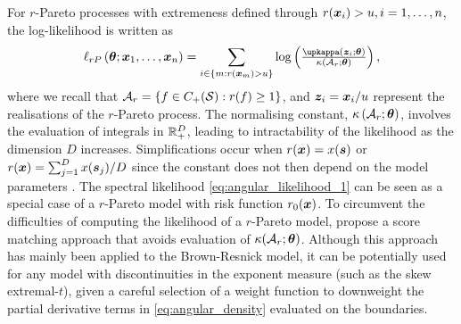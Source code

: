 \documentclass[12pt]{article}
\newcommand{\PZ}{\textcolor{blue}}
\begin{document}

For $r$-Pareto processes with extremeness defined through $r({\boldsymbol{x}}_i)>u, i=1, \ldots,n$, the log-likelihood is written as
%
\begin{equation}\label{eq:angular_likelihood_3}
\ell_{rP}\left( \bm \theta; \bx_1, \ldots, \bx_n \right) = \sum_{i \in \left\{ m: r(\bx_m) > u \right\}} \log \left( \frac{\upkappa \left(\bz_i; \bm \theta \right)}{\kappa\left( \calA_r; \bm \theta \right)} \right),    
\end{equation}
%
where we recall that ${\mathcal A}_r = \left\{ f \in C_+({\mathcal{S}}): r(f) \geq 1 \right\}$, and ${\boldsymbol{z}}_{i} = {\boldsymbol{x}}_{i}/u$ represent the realisations of the $r$-Pareto process. The normalising constant, $\kappa\left( {\mathcal A}_r; \bm \theta \right)$, involves the evaluation of integrals in ${\mathbb R}_+^D$, leading to intractability of the likelihood as the dimension $D$ increases. Simplifications occur when $r({\boldsymbol{x}}) = x({\boldsymbol{s}})$ or $r({\boldsymbol{x}}) = \sum_{j=1}^D x({\boldsymbol{s}}_j)/D$ since the constant does not then depend on the model parameters
\citep[see][]{deFondeville.Davison:2018, Dombry.etal:2024}. 
The spectral likelihood \eqref{eq:angular_likelihood_1} can be seen as a special case of a $r$-Pareto model with risk function \PZ{$r_0({\boldsymbol{x}})$}. 
%
To circumvent the difficulties of computing the likelihood of a $r$-Pareto model, \citet{deFondeville.Davison:2018} propose a score matching approach that 
avoids
evaluation of $\kappa({\mathcal A}_r;\bm \theta)$. 
Although this approach has mainly been applied to the Brown-Resnick model, it can be potentially used for any model with discontinuities in the exponent measure (such as the skew extremal-$t$), given a careful selection of a weight function to downweight the partial derivative terms in \eqref{eq:angular_density} evaluated on the boundaries.
\end{document}
